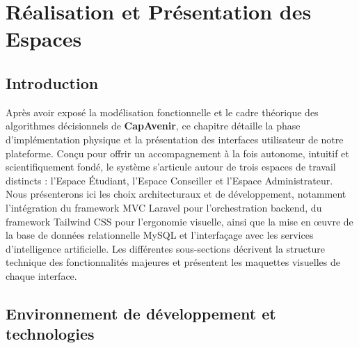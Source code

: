 
\chapter{Réalisation et Présentation des Espaces}
\label{chap:realisation_plateforme}

\section*{Introduction}

Après avoir exposé la modélisation fonctionnelle et le cadre théorique des algorithmes décisionnels de \textbf{CapAvenir}, ce chapitre détaille la phase d'implémentation physique et la présentation des interfaces utilisateur de notre plateforme. Conçu pour offrir un accompagnement à la fois autonome, intuitif et scientifiquement fondé, le système s'articule autour de trois espaces de travail distincts : l'Espace Étudiant, l'Espace Conseiller et l'Espace Administrateur. Nous présenterons ici les choix architecturaux et de développement, notamment l'intégration du framework MVC Laravel pour l'orchestration backend, du framework Tailwind CSS pour l'ergonomie visuelle, ainsi que la mise en œuvre de la base de données relationnelle MySQL et l'interfaçage avec les services d'intelligence artificielle. Les différentes sous-sections décrivent la structure technique des fonctionnalités majeures et présentent les maquettes visuelles de chaque interface.

\section{Environnement de développement et technologies}

